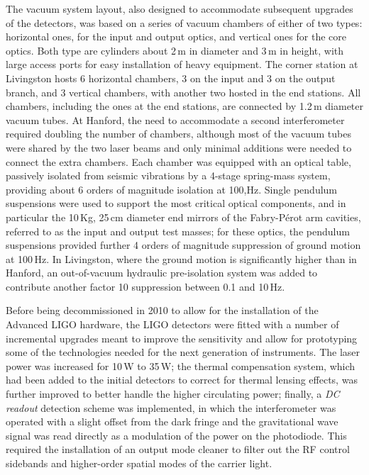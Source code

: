 The vacuum system layout, also designed to accommodate subsequent upgrades of the detectors, was based on a series of vacuum chambers of either of two types: horizontal ones, for the input and output optics, and vertical ones for the core optics.
Both type are cylinders about 2\,m in diameter and 3\,m in height, with large access ports for easy installation of heavy equipment.
The corner station at Livingston hosts 6 horizontal chambers, 3 on the input and 3  on the output branch, and 3 vertical chambers, with another two hosted in the end stations.
All chambers, including the ones at the end stations, are connected by 1.2\,m diameter vacuum tubes.
At Hanford, the need to accommodate a second interferometer required doubling the number of chambers, although most of the vacuum tubes were shared by the two laser beams and only minimal additions were needed to connect the extra chambers.
Each chamber was equipped with an optical table, passively isolated from seismic vibrations by a 4-stage spring-mass system, providing about 6 orders of magnitude isolation at 100,Hz\cite{Giaime_1996}. Single pendulum suspensions were used to support the most critical optical components, and in particular the 10\,Kg, 25\,cm diameter end mirrors of the Fabry-P\'{e}rot arm cavities, referred to as the input and output test masses; for these optics, the pendulum suspensions provided further 4 orders of magnitude suppression of ground motion at 100\,Hz.
In Livingston, where the ground motion is significantly higher than in Hanford, an out-of-vacuum hydraulic pre-isolation system was added to contribute another factor 10 suppression between 0.1 and 10\,Hz.

Before being decommissioned in 2010 to allow for the installation of the Advanced LIGO hardware, the LIGO detectors were fitted with a number of incremental upgrades\cite{Aasi_2015} meant to improve the sensitivity and allow for prototyping some of the technologies needed for the next generation of instruments.
The laser power was increased for 10\,W to 35\,W;
the thermal compensation system, which had been added to the initial detectors to correct for thermal lensing effects, was further improved to better handle the higher circulating power;
finally, a \textit{DC readout} detection scheme was implemented, in which the interferometer was operated with a slight offset from the dark fringe and the gravitational wave signal was read directly as a modulation of the power on the photodiode.
This required the installation of an output mode cleaner to filter out the RF control sidebands and higher-order spatial modes of the carrier light.

